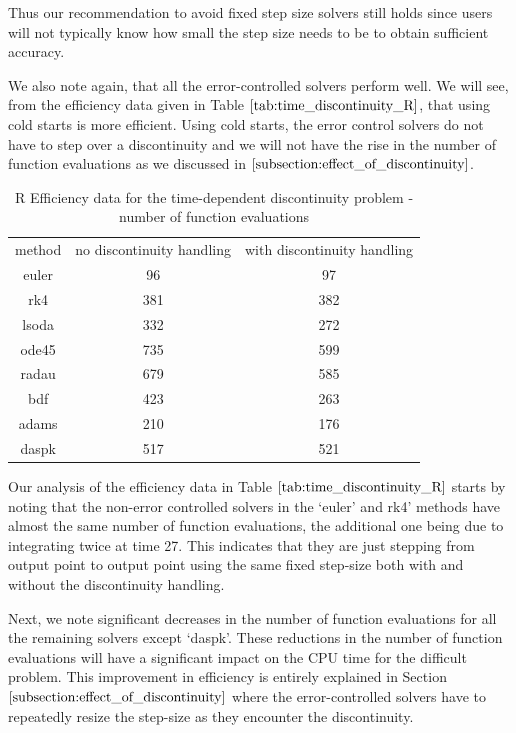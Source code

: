 Thus our recommendation to avoid fixed step size solvers still holds since users will not typically know how small the step size needs to be to obtain sufficient accuracy.

We also note again, that all the error-controlled solvers perform well. We will see, from the efficiency data given in Table $\ref{tab:time_discontinuity_R}$, that using cold starts is more efficient. Using cold starts, the error control solvers do not have to step over a discontinuity and we will not have the rise in the number of function evaluations as we discussed in $\ref{subsection:effect_of_discontinuity}$. 

\begin{table}[H]
\caption {R Efficiency data for the time-dependent discontinuity problem - number of function evaluations} 
\label{tab:time_discontinuity_R}
\begin{center}
\begin{tabular}{ c c c } 
method & no discontinuity handling & with discontinuity handling \\ 
euler & 96 & 97 \\
rk4 & 381 & 382 \\ 
lsoda & 332 & 272 \\
ode45 & 735 & 599 \\
radau & 679 & 585 \\
bdf & 423 & 263 \\
adams & 210 & 176 \\
daspk & 517 & 521
\end{tabular}
\end{center}
\end{table}

Our analysis of the efficiency data in Table $\ref{tab:time_discontinuity_R}$ starts by noting that the non-error controlled solvers in the `euler' and rk4' methods have almost the same number of function evaluations, the additional one being due to integrating twice at time 27. This indicates that they are just stepping from output point to output point using the same fixed step-size both with and without the discontinuity handling.

Next, we note significant decreases in the number of function evaluations for all the remaining solvers except `daspk'. These reductions in the number of function evaluations will have a significant impact on the CPU time for the difficult problem. This improvement in efficiency is entirely explained in Section $\ref{subsection:effect_of_discontinuity}$ where the error-controlled solvers have to repeatedly resize the step-size as they encounter the discontinuity.


